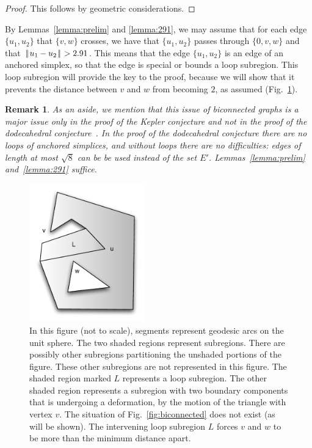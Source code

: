\documentclass[11pt]{amsart}
\def\|{{\hskip0.1em|\hskip-0.15em|\hskip0.1em}}
\newtheorem{remark}{Remark}
\begin{document}
\begin{proof} This follows by geometric considerations.
\end{proof}

By Lemmas~\ref{lemma:prelim} and \ref{lemma:291}, we may assume that for each edge $\{u_1,u_2\}$ that $\{v,w\}$ crosses,
we have that $\{u_1,u_2\}$ passes through $\{0,v,w\}$ and that $\|u_1-u_2\|>2.91$.  This means that the edge $\{u_1,u_2\}$ is an edge of an anchored simplex,
so that the edge is special or bounds a loop subregion.
This loop subregion will provide the key to the proof, because we will show
that it prevents the distance between $v$ and $w$ from becoming $2$,
as assumed  (Fig.~\ref{fig:biconnectedloop}).


\begin{remark}
As an aside, we mention that this issue of biconnected graphs is a major issue only in the 
proof of the Kepler conjecture and not
in the proof of the dodecahedral conjecture~\cite{Hales:2008:Dodec}.  In the proof of the dodecahedral conjecture there are no loops of anchored simplices, and without loops there are no difficulties: edges of length at most
$\sqrt8$ can be be used instead of the set $E'$.  Lemmas~\ref{lemma:prelim} and~\ref{lemma:291} suffice.
\end{remark}

\begin{figure}
\begin{center}
\includegraphics[width=5cm]{biconnectedloop.pdf}
\end{center}
\caption{In this figure (not to scale), segments represent geodesic arcs on the unit sphere.  The two shaded regions represent
subregions.    There are possibly other subregions partitioning the unshaded portions of the figure.  These other subregions are not represented in this figure.  The shaded region marked $L$ represents a loop subregion. The other shaded region represents a subregion with two boundary components that is undergoing a deformation, by the motion of the triangle with vertex $v$.  The situation of Fig.~\ref{fig:biconnected} does not exist
(as will be shown).  The  intervening loop subregion $L$  forces
$v$ and $w$ to be more than the minimum distance apart.}
\label{fig:biconnectedloop}
\end{figure}
\end{document}
